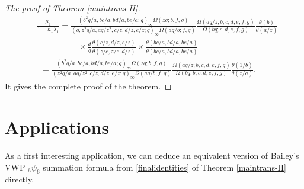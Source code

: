 \documentclass[xits,review,sort&compress]{elsarticle}
\numberwithin{equation}{section}
\newcommand{\poq}[2]{(#1;q)_{#2}}
\begin{document}
\begin{proof}[The  proof of Theorem \ref{maintrans-II}]
\begin{align*}
&\frac{\mu_1}{1-\kappa_1\lambda_1}=\frac{\poq{b^2 q/a,bc/a,bd/a,be/a}{\infty}\Omega(zq;b,f,g)}{\poq{q,z^2q/a,aq/z^2,c/z,d/z,e/z}{\infty}\Omega(aq/b;f,g)}
\frac{\Omega(aq/z;b,c,d,e,f,g)}{\Omega(bq;c,d,e,f,g)} \frac{\theta(b)}{\theta(a/z)}\\
&\qquad\qquad\quad\times\frac{d}{q}
\frac{\theta(c/z,d/z,e/z)}{\theta(z/c, z/e,d/z)}\times
\frac{\theta(bc/a,bd/a,be/a)}{\theta(bc/a,bd/a,be/a)}\\
&~~=\frac{\poq{b^2 q/a,bc/a,bd/a,be/a}{\infty}\Omega(zq;b,f,g)}{\poq{z^2q/a,aq/z^2,c/z,d/z,e/z}{\infty}\Omega(aq/b;f,g)}
\frac{\Omega(aq/z;b,c,d,e,f,g)}{\Omega(bq;b,c,d,e,f,g)} \frac{\theta(1/b)}{\theta(z/a)}.
\end{align*}
It gives the complete proof of the theorem.
\end{proof}

\section{Applications}

As a first interesting application, we can deduce an equivalent version of  Bailey's VWP ${}_6\psi_6$ summation formula  from \eqref{finalidentities}  of  Theorem \ref{maintrans-II} directly.
\end{document}
